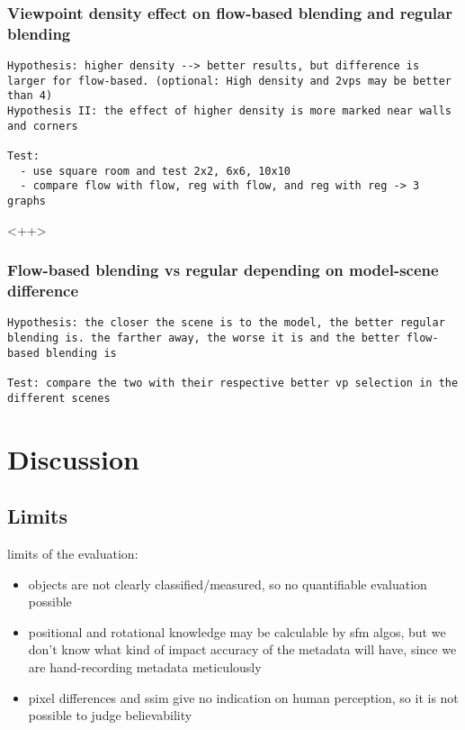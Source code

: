 \subsubsection{Viewpoint density effect on flow-based blending and regular blending}
\begin{verbatim}
Hypothesis: higher density --> better results, but difference is larger for flow-based. (optional: High density and 2vps may be better than 4)
Hypothesis II: the effect of higher density is more marked near walls and corners

Test:
  - use square room and test 2x2, 6x6, 10x10
  - compare flow with flow, reg with flow, and reg with reg -> 3 graphs

\end{verbatim}<++>

\subsubsection{Flow-based blending vs regular depending on model-scene difference}
\begin{verbatim}
Hypothesis: the closer the scene is to the model, the better regular blending is. the farther away, the worse it is and the better flow-based blending is

Test: compare the two with their respective better vp selection in the different scenes

\end{verbatim}


\section{Discussion}

\subsection{Limits}

limits of the evaluation:
\begin{itemize}
  \item objects are not clearly classified/measured, so no quantifiable evaluation possible
  \item positional and rotational knowledge may be calculable by sfm algos, but we don't know what kind of impact accuracy of the metadata will have, since we are hand-recording metadata meticulously
  \item pixel differences and ssim give no indication on human perception, so it is not possible to judge believability
\end{itemize}

